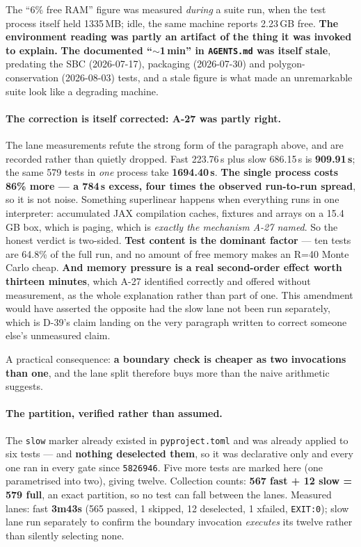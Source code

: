 \documentclass[
  10pt,
]{article}
\begin{document}
The ``6\% free RAM'' figure was measured \emph{during} a suite run, when the test process itself held 1335\,MB; idle, the same machine reports 2.23\,GB free. \textbf{The environment reading was partly an artifact of the thing it was invoked to explain.} \textbf{The documented ``$\sim$1\,min'' in \texttt{AGENTS.md} was itself stale}, predating the SBC (2026-07-17), packaging (2026-07-30) and polygon-conservation (2026-08-03) tests, and a stale figure is what made an unremarkable suite look like a degrading machine.

\paragraph{The correction is itself corrected: A-27 was partly right.}
The lane measurements refute the strong form of the paragraph above, and are recorded rather than quietly dropped. Fast 223.76\,s plus slow 686.15\,s is \textbf{909.91\,s}; the same 579 tests in \emph{one} process take \textbf{1694.40\,s}. \textbf{The single process costs 86\% more --- a 784\,s excess, four times the observed run-to-run spread}, so it is not noise. Something superlinear happens when everything runs in one interpreter: accumulated JAX compilation caches, fixtures and arrays on a 15.4\,GB box, which is paging, which is \emph{exactly the mechanism A-27 named}. So the honest verdict is two-sided. \textbf{Test content is the dominant factor} --- ten tests are 64.8\% of the full run, and no amount of free memory makes an R=40 Monte Carlo cheap. \textbf{And memory pressure is a real second-order effect worth thirteen minutes}, which A-27 identified correctly and offered without measurement, as the whole explanation rather than part of one. This amendment would have asserted the opposite had the slow lane not been run separately, which is D-39's claim landing on the very paragraph written to correct someone else's unmeasured claim.

A practical consequence: \textbf{a boundary check is cheaper as two invocations than one}, and the lane split therefore buys more than the naive arithmetic suggests.

\paragraph{The partition, verified rather than assumed.}
The \texttt{slow} marker already existed in \texttt{pyproject.toml} and was already applied to six tests --- and \textbf{nothing deselected them}, so it was declarative only and every one ran in every gate since \texttt{5826946}. Five more tests are marked here (one parametrised into two), giving twelve. Collection counts: \textbf{567 fast + 12 slow = 579 full}, an exact partition, so no test can fall between the lanes. Measured lanes: fast \textbf{3m43s} (565 passed, 1 skipped, 12 deselected, 1 xfailed, \texttt{EXIT:0}); slow lane run separately to confirm the boundary invocation \emph{executes} its twelve rather than silently selecting none.
\end{document}
